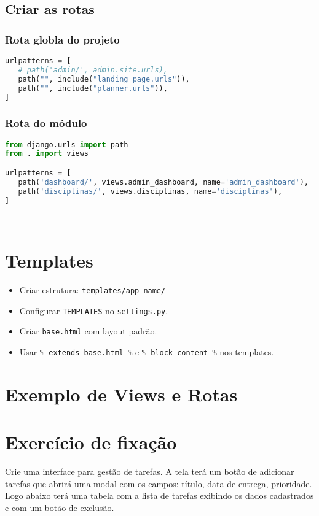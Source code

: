 \subsection{Criar as rotas}
\subsubsection{Rota globla do projeto}
\begin{lstlisting}[language=Python]
    urlpatterns = [
   # path('admin/', admin.site.urls),
   path("", include("landing_page.urls")),
   path("", include("planner.urls")),
]

\end{lstlisting}

\subsubsection{Rota do módulo}
\begin{lstlisting}[language=Python]
from django.urls import path
from . import views

urlpatterns = [
   path('dashboard/', views.admin_dashboard, name='admin_dashboard'),
   path('disciplinas/', views.disciplinas, name='disciplinas'),
]

    
\end{lstlisting}

\section{Templates}
\begin{itemize}
  \item Criar estrutura: \texttt{templates/app\_name/}
  \item Configurar \texttt{TEMPLATES} no \texttt{settings.py}.
  \item Criar \texttt{base.html} com layout padr\~ao.
  \item Usar \texttt{{\% extends \textquotedbl{}base.html\textquotedbl{} \%}} e \texttt{{\% block content \%}} nos templates.
\end{itemize}

\section{Exemplo de Views e Rotas}


\section{Exercício de fixação}
Crie uma interface para gestão de tarefas. A tela terá um botão de adicionar tarefas que abrirá uma modal com os campos: título, data de entrega, prioridade.
Logo abaixo terá uma tabela com a lista de tarefas exibindo os dados cadastrados e com um botão de exclusão.


